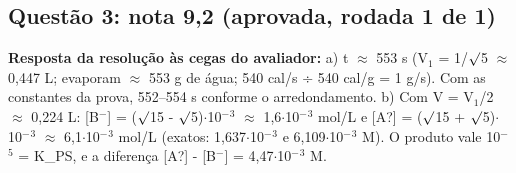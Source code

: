 \documentclass{article}%
\begin{document}
\subsection*{Questão 3: nota 9,2 (aprovada, rodada 1 de 1)}%
\textbf{Resposta da resolução às cegas do avaliador:} a) t $\approx$ 553 s (V$_{1}$ = 1/$\surd$5 $\approx$ 0,447 L; evaporam $\approx$ 553 g de água; 540 cal/s ÷ 540 cal/g = 1 g/s). Com as constantes da prova, 552--554 s conforme o arredondamento.\newline%
b) Com V = V$_{1}$/2 $\approx$ 0,224 L: {[}B$^{-}${]} = ($\surd$15 - $\surd$5)$\cdot$10$^{-}$$^3$ $\approx$ 1,6$\cdot$10$^{-}$$^3$ mol/L e {[}A?{]} = ($\surd$15 + $\surd$5)$\cdot$10$^{-}$$^3$ $\approx$ 6,1$\cdot$10$^{-}$$^3$ mol/L (exatos: 1,637$\cdot$10$^{-}$$^3$ e 6,109$\cdot$10$^{-}$$^3$ M). O produto vale 10$^{-}$$^{5}$ = K\_PS, e a diferença {[}A?{]} - {[}B$^{-}${]} = 4,47$\cdot$10$^{-}$$^3$ M.\par %
\end{document}
